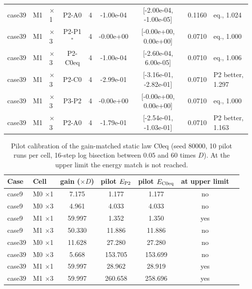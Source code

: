 {\begin{longtable}{lllcccccl}
case39 & M1 & $\times$1 & P2-A0 & 4 & -1.00e-04 & [-2.00e-04, -1.00e-05] & 0.1160 & eq., 1.024\\
case39 & M1 & $\times$3 & P2-P1$^*$ & 4 & -0.00e+00 & [-0.00e+00, 0.00e+00] & 0.0710 & eq., 1.000\\
case39 & M1 & $\times$3 & P2-C0eq & 4 & -1.00e-04 & [-2.60e-04, 6.00e-05] & 0.0710 & eq., 1.006\\
case39 & M1 & $\times$3 & P2-C0 & 4 & -2.99e-01 & [-3.16e-01, -2.82e-01] & 0.0710 & P2 better, 1.297\\
case39 & M1 & $\times$3 & P3-P2 & 4 & -0.00e+00 & [-0.00e+00, 0.00e+00] & 0.0710 & eq., 1.000\\
case39 & M1 & $\times$3 & P2-A0 & 4 & -1.79e-01 & [-2.54e-01, -1.03e-01] & 0.0710 & P2 better, 1.163\\
\bottomrule
\end{longtable}
}

\begin{table}[H]\centering\small
\caption{Pilot calibration of the gain-matched static law C0eq (seed 80000, 10 pilot runs per cell, 16-step log bisection between $0.05$ and $60$ times $D$). At the upper limit the energy match is not reached.}
\label{tab:S:regc0eq}
\begin{tabular}{llccccc}
\toprule
Case & Cell & gain ($\times D$) & pilot $E_{\rm P2}$ & pilot $E_{\rm C0eq}$ & at upper limit\\
\midrule
case9 & M0 $\times$1 & 7.175 & 1.177 & 1.177 & no\\
case9 & M0 $\times$3 & 4.961 & 4.033 & 4.033 & no\\
case9 & M1 $\times$1 & 59.997 & 1.352 & 1.350 & yes\\
case9 & M1 $\times$3 & 50.330 & 11.886 & 11.886 & no\\
case39 & M0 $\times$1 & 11.628 & 27.280 & 27.280 & no\\
case39 & M0 $\times$3 & 5.668 & 153.705 & 153.699 & no\\
case39 & M1 $\times$1 & 59.997 & 28.962 & 28.919 & yes\\
case39 & M1 $\times$3 & 59.997 & 260.658 & 258.696 & yes\\
\bottomrule
\end{tabular}
\end{table}
